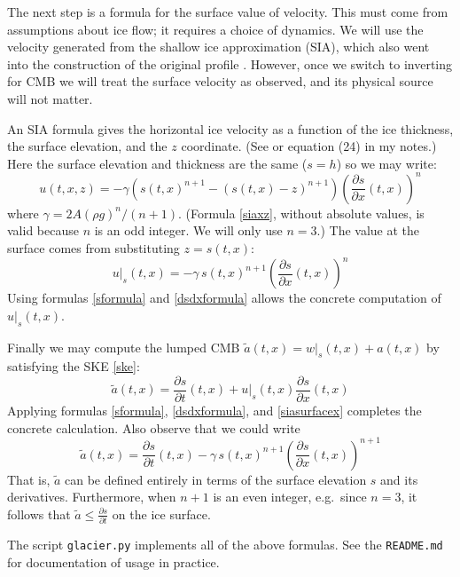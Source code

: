 \documentclass[letterpaper,final,12pt,reqno]{amsart}
\begin{document}
The next step is a formula for the surface value of velocity.  This must come from assumptions about ice flow; it requires a choice of dynamics.  We will use the velocity generated from the shallow ice approximation (SIA), which also went into the construction of the original profile \cite[section 5.3]{vanderVeen2013}.  However, once we switch to inverting for CMB we will treat the surface velocity as observed, and its physical source will not matter.

An SIA formula gives the horizontal ice velocity as a function of the ice thickness, the surface elevation, and the $z$ coordinate.  (See \cite{GreveBlatter2009,vanderVeen2013} or equation (24) in my notes.)  Here the surface elevation and thickness are the same ($s=h$) so we may write:
\begin{equation}
u(t,x,z) = - \gamma \left(s(t,x)^{n+1} - (s(t,x)-z)^{n+1}\right) \left(\frac{\partial s}{\partial x}(t,x)\right)^n \label{siaxz}
\end{equation}
where $\gamma = 2 A (\rho g)^n / (n+1)$.  (Formula \eqref{siaxz}, without absolute values, is valid because $n$ is an odd integer.  We will only use $n=3$.)  The value at the surface comes from substituting $z=s(t,x)$:
\begin{equation}
u|_s(t,x) = - \gamma\, s(t,x)^{n+1} \left(\frac{\partial s}{\partial x}(t,x)\right)^n \label{siasurfacex}
\end{equation}
Using formulas \eqref{sformula} and \eqref{dsdxformula} allows the concrete computation of $u|_s(t,x)$.

Finally we may compute the lumped CMB $\tilde a(t,x) = w|_s(t,x) + a(t,x)$ by satisfying the SKE \eqref{ske}:
\begin{equation}
\tilde a(t,x) = \frac{\partial s}{\partial t}(t,x) + u|_s(t,x) \frac{\partial s}{\partial x}(t,x) \label{atildeformula}
\end{equation}
Applying formulas \eqref{sformula}, \eqref{dsdxformula}, and \eqref{siasurfacex} completes the concrete calculation.  Also observe that we could write
\begin{equation}
\tilde a(t,x) = \frac{\partial s}{\partial t}(t,x) - \gamma\, s(t,x)^{n+1} \left(\frac{\partial s}{\partial x}(t,x)\right)^{n+1} \label{atildefroms}
\end{equation}
That is, $\tilde a$ can be defined entirely in terms of the surface elevation $s$ and its derivatives.  Furthermore, when $n+1$ is an even integer, e.g.~since $n=3$, it follows that $\tilde a \le \frac{\partial s}{\partial t}$ on the ice surface.

The script \texttt{glacier.py} implements all of the above formulas.  See the \texttt{README.md} for documentation of usage in practice.

\small
\bigskip


\end{document}
